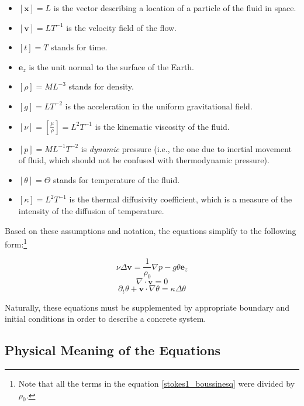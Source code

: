 \documentclass[
10pt, %
a4paper, %
oneside, %
headinclude,footinclude, %
BCOR5mm, %
]{scrartcl}
\providecommand{\divergence}{\nabla\cdot}
\providecommand{\velocity}{\mathbf{v}}
\providecommand{\surfaceNormal}{\mathbf{e}_z}
\providecommand{\pressGrad}{\nabla p}
\providecommand{\laplacianVel}{\Delta\velocity}
\providecommand{\partialTimeTemp}{\partial_t\theta}
\providecommand{\inertTermTemp}{\velocity\cdot\nabla\theta}
\providecommand{\laplacianTemp}{\Delta\theta}
\begin{document}
\begin{itemize}

\item[] $ [\mathbf{x}] = L $ is the vector describing a location of a particle of the fluid in space.
\item[] $ [\velocity] = L T^{-1} $ is the velocity field of the flow.
\item[] $ [t] = T $ stands for time.
\item[] $\surfaceNormal$ is the unit normal to the surface of the Earth.
\item[] $ [\rho] = M L^{-3} $ stands for density.
\item[] $[g] = LT^{-2} $ is the acceleration in the uniform gravitational field.
\item[] $ [\nu] = [\frac{\mu}{\rho}] = L^{2} T^{-1} $ is the kinematic viscosity of the fluid.
\item[] $ [p] = M L^{-1} T^{-2} $ is \emph{dynamic} pressure (i.e., the one due to inertial movement of fluid, which should not be confused with thermodynamic pressure).
\item[] $ [\theta] = \Theta $ stands for temperature of the fluid.
\item[] $ [\kappa] = L^{2} T^{-1} $ is the thermal diffusivity coefficient, which is a measure of the intensity of the diffusion of temperature.

\end{itemize}

Based on these assumptions and notation, the equations simplify to the following form:\footnote{Note that all the terms in the equation \ref{stokes1_boussinesq} were divided by $\rho_0$.}

\begin{equation} \label{stokes1_boussinesq}
\nu \laplacianVel = \frac{1}{\rho_0}\pressGrad - g \theta \surfaceNormal
\end{equation}
\begin{equation} \label{stokes2_boussinesq}
\divergence \velocity = 0
\end{equation}
\begin{equation} \label{heat_eq_visc_boussinesq_prandtl}
\partialTimeTemp + \inertTermTemp = \kappa \laplacianTemp  
\end{equation} 

Naturally, these equations must be supplemented by appropriate boundary and initial conditions in order to describe a concrete system.

\subsection{Physical Meaning of the Equations}
\end{document}
